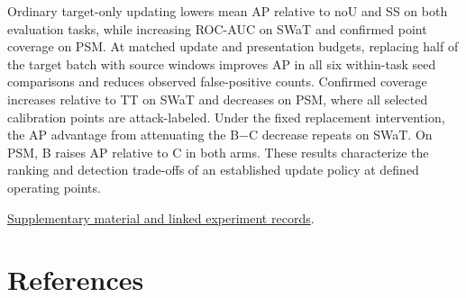 \documentclass[
  american,
]{article}
\begin{document}
Ordinary target-only updating lowers mean AP relative to noU and SS on
both evaluation tasks, while increasing ROC-AUC on SWaT and confirmed
point coverage on PSM. At matched update and presentation budgets,
replacing half of the target batch with source windows improves AP in
all six within-task seed comparisons and reduces observed false-positive
counts. Confirmed coverage increases relative to TT on SWaT and
decreases on PSM, where all selected calibration points are
attack-labeled. Under the fixed replacement intervention, the AP
advantage from attenuating the B−C decrease repeats on SWaT. On PSM, B
raises AP relative to C in both arms. These results characterize the
ranking and detection trade-offs of an established update policy at
defined operating points.

\href{supplement.md}{Supplementary material and linked experiment
records}.

\section*{References}\label{bibliography}
\end{document}
